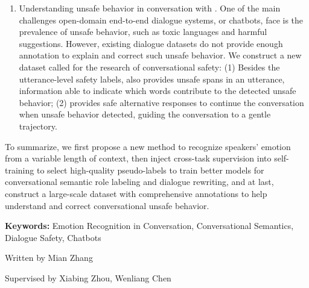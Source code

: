 \begin{eabstract}
\begin{enumerate}
		\item Understanding unsafe behavior in conversation with \data{}. One of the main challenges open-domain end-to-end dialogue systems, or chatbots, face is the prevalence of unsafe behavior, such as toxic languages and harmful suggestions. However, existing dialogue datasets do not provide enough annotation to explain and correct such unsafe behavior. We construct a new dataset called \data{} for the research of conversational safety: (1) Besides the utterance-level safety labels, \data{} also provides unsafe spans in an utterance, information able to indicate which words contribute to the detected unsafe behavior; (2) \data{} provides safe alternative responses to continue the conversation when unsafe behavior detected, guiding the conversation to a gentle trajectory.

	\end{enumerate}
 
        To summarize, we first propose a new method to recognize speakers' emotion from a variable length of context, then inject cross-task supervision into self-training to select high-quality pseudo-labels to train better models for conversational semantic role labeling and dialogue rewriting, and at last, construct a large-scale dataset with comprehensive annotations to help understand and correct conversational unsafe behavior.
        
	\vskip 21bp
	{\bf{} Keywords: }
	Emotion Recognition in Conversation,
        Conversational Semantics,
        Dialogue Safety,
        Chatbots
\end{eabstract}

\begin{flushright}
	Written by Mian Zhang
	
	Supervised by Xiabing Zhou, Wenliang Chen
\end{flushright}